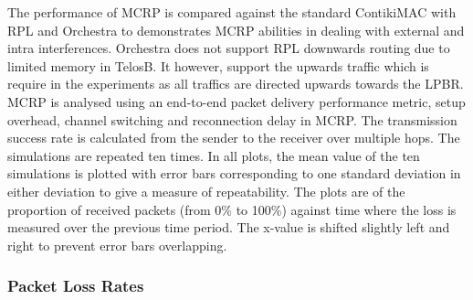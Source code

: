 The performance of MCRP is compared against the standard ContikiMAC with RPL and Orchestra to demonstrates MCRP abilities in dealing with external and intra interferences. Orchestra does not support RPL downwards routing due to limited memory in TelosB. It however, support the upwards traffic which is require in the experiments as all traffics are directed upwards towards the LPBR.
MCRP is analysed using an end-to-end packet delivery performance metric, setup overhead, channel switching and reconnection delay in MCRP. The transmission success rate is calculated from the sender to the receiver over multiple hops. 
The simulations are repeated ten times. In all plots, the mean value of the ten simulations is plotted with error bars corresponding to one standard deviation in either deviation to give a measure of repeatability. The plots are of the proportion of received packets (from 0\% to 100\%) against time where the loss is measured over the previous time period.  The x-value is shifted slightly left and right to prevent error bars overlapping.



\subsubsection{Packet Loss Rates}

